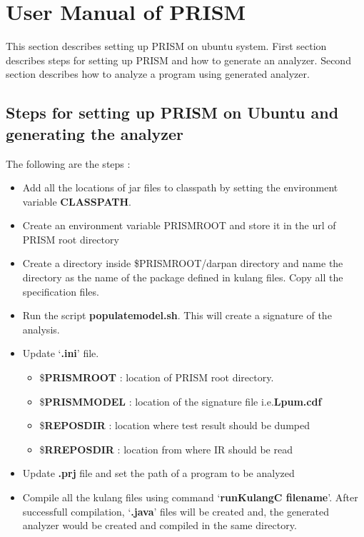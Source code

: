 \documentclass[11pt,a4paper,openright]{report}
\begin{document}
\appendix

\chapter{User Manual of PRISM} \label{ap:A}
This section describes setting up PRISM on ubuntu system. First section describes steps for setting up PRISM and how to generate an analyzer.
Second section describes how to analyze a program using generated analyzer.

\section{Steps for setting up PRISM on Ubuntu and generating the analyzer}

The following are the steps :
\begin{itemize}
 \item  Add all the locations of jar files to classpath by setting the environment variable \textbf{CLASSPATH}. 
 \item Create an environment variable PRISMROOT and store it in the url of PRISM root directory
 \item Create a directory inside \$PRISMROOT/darpan directory and name the directory as the name of the package defined in kulang 
 files. Copy all the specification files.
 \item Run the script \textbf{populatemodel.sh}. This will create a signature of the analysis.
 \item Update `\textbf{.ini}' file.
	\begin{itemize}
	 \item \$\textbf{PRISMROOT} : location of PRISM root directory.
	 \item \$\textbf{PRISMMODEL} : location of the signature file i.e.\textbf{Lpum.cdf}
	 \item \$\textbf{REPOSDIR} : location where test result should be dumped
	 \item \$\textbf{RREPOSDIR} : location from where IR should be read
	\end{itemize}
\item Update  \textbf{.prj} file and set the path of a program to be analyzed
\item Compile all the kulang files using command `\textbf{runKulangC filename}'. After successfull compilation, `\textbf{.java}' 
 files will be created and, the generated analyzer would be created and compiled in the same directory.
\end{itemize}
\end{document}
